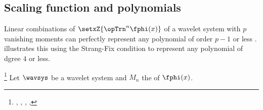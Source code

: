 \subsection{Scaling function and polynomials}
Linear combinations of $\setxZ{\opTrn^n\fphi(x)}$ of a wavelet system with $p$ vanishing moments
can perfectly represent any polynomial of order $p-1$ or less .
 illustrates this using the Strang-Fix condition 
to represent any polynomial of dgree $4$ or less.
\begin{lemma} %
\label{lem:sfixc}
\footnote{
  ,
  ,
  ,
  ,
  }
Let $\wavsys$ be a wavelet system and $M_n$ the   of $\fphi(x)$.
\end{lemma}
